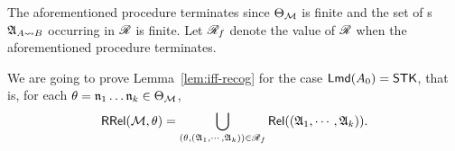 The aforementioned procedure terminates since $\Theta_{\mathcal{M} }$ is finite and the set of {\NFA}s ${\mathfrak{A} }_{A\rightsquigarrow B}$ occurring in $\mathscr{R}$ is finite.
Let $\mathscr{R}_f$ denote the value of $\mathscr{R}$ when the aforementioned procedure terminates. 










We are going to prove Lemma~\ref{lem:iff-recog} for the case ${\sf Lmd}(A_0) = {\sf STK}$, that is, for each $\theta=\mathfrak{n}_1\dots\mathfrak{n}_k\in\Theta_{{\mathcal{M} }}$, 
%
\[\mathsf{RRel}({\mathcal{M} }, \theta) = \bigcup \limits_{(\theta, ({\mathfrak{A} }_1, \cdots, {\mathfrak{A} }_k)) \in \mathscr{R}_f} \mathsf{Rel}(({\mathfrak{A} }_1, \cdots, {\mathfrak{A} }_k)).\]

